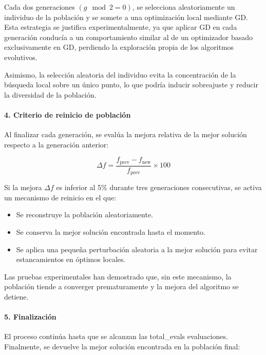 Cada dos generaciones $(g \mod 2 = 0)$, se selecciona aleatoriamente un individuo de la población y se somete a una optimización local mediante GD. Esta estrategia se justifica experimentalmente, ya que aplicar GD en cada generación conducía a un comportamiento similar al de un optimizador basado exclusivamente en GD, perdiendo la exploración propia de los algoritmos evolutivos.  

Asimismo, la selección aleatoria del individuo evita la concentración de la búsqueda local sobre un único punto, lo que podría inducir sobreajuste y reducir la diversidad de la población.

\paragraph{4. Criterio de reinicio de población\\}

Al finalizar cada generación, se evalúa la mejora relativa de la mejor solución respecto a la generación anterior:

\begin{equation*}
    \Delta f = \frac{f_{\text{prev}} - f_{\text{new}}}{f_{\text{prev}}} \times 100
\end{equation*}

Si la mejora $\Delta f$ es inferior al 5\% durante tres generaciones consecutivas, se activa un mecanismo de reinicio en el que:
\begin{itemize}
    \item Se reconstruye la población aleatoriamente.
    \item Se conserva la mejor solución encontrada hasta el momento.
    \item Se aplica una pequeña perturbación aleatoria a la mejor solución para evitar estancamientos en óptimos locales.
\end{itemize}

Las pruebas experimentales han demostrado que, sin este mecanismo, la población tiende a converger prematuramente y la mejora del algoritmo se detiene.

\paragraph{5. Finalización\\}

El proceso continúa hasta que se alcanzan las total\_evals evaluaciones. Finalmente, se devuelve la mejor solución encontrada en la población final:

